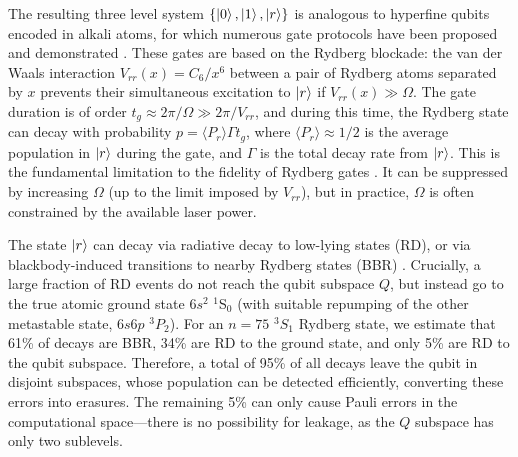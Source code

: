 \documentclass[%
reprint,
superscriptaddress,
 amsmath,amssymb,
 aps,
 prx,
floatfix,
]{revtex4-1}
\begin{document}
The resulting three level system $\{\ket{0},\ket{1},\ket{r}\}$ is analogous to hyperfine qubits encoded in alkali atoms, for which numerous gate protocols have been proposed and demonstrated \cite{jaksch2000,Lukin2001,isenhower2010,wilk2010,Levine2019,mitra2020,saffman2020}. These gates are based on the Rydberg blockade: the van der Waals interaction $V_{rr}(x) = C_6/x^6$ between a pair of Rydberg atoms separated by $x$ prevents their simultaneous excitation to $\ket{r}$ if $V_{rr}(x) \gg \Omega$. The gate duration is of order $t_g \approx 2\pi/\Omega \gg 2\pi/V_{rr}$, and during this time, the Rydberg state can decay with probability $p = \langle P_r \rangle \Gamma t_g$, where $\langle P_r \rangle \approx 1/2$ is the average population in $\ket{r}$ during the gate, and $\Gamma$ is the total decay rate from $\ket{r}$. This is the fundamental limitation to the fidelity of Rydberg gates \cite{Saffman2010}. It can be suppressed by increasing $\Omega$ (up to the limit imposed by $V_{rr}$), but in practice, $\Omega$ is often constrained by the available laser power.

The state $\ket{r}$ can decay via radiative decay to low-lying states (RD), or via blackbody-induced transitions to nearby Rydberg states (BBR) \cite{Saffman2010}. Crucially, a large fraction of RD events do not reach the qubit subspace $Q$, but instead go to the true atomic ground state $6s^2$ ${}^{1}$S$_{0}$ (with suitable repumping of the other metastable state, $6s6p$ ${}^{3}P_{2}$). For an $n=75$ $^3S_1$ Rydberg state, we estimate that 61\% of decays are BBR, 34\% are RD to the ground state, and only 5\% are RD to the qubit subspace. Therefore, a total of 95\% of all decays leave the qubit in disjoint subspaces, whose population can be detected efficiently, converting these errors into erasures. The remaining 5\% can only cause Pauli errors in the computational space---there is no possibility for leakage, as the $Q$ subspace has only two sublevels.
\end{document}
